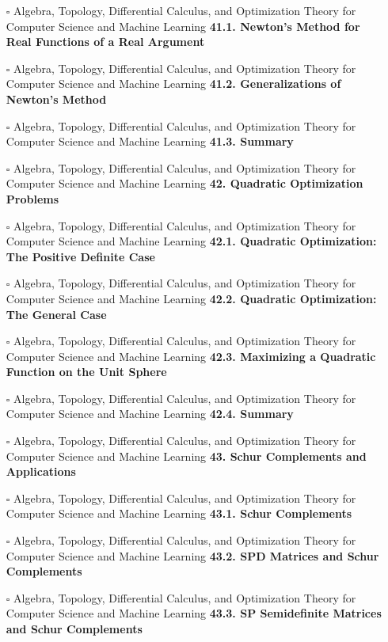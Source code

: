 \documentclass[a4, landscape, 12pt]{article}
\newcommand{\checkbox}{$\square$}%
\begin{document}
\begin{itemize}
{}
\item [\checkbox]  Algebra, Topology, Differential Calculus, and Optimization Theory for Computer Science and Machine Learning \textbf{ 41.1. Newton’s Method for Real Functions of a Real Argument
}
\item [\checkbox]  Algebra, Topology, Differential Calculus, and Optimization Theory for Computer Science and Machine Learning \textbf{ 41.2. Generalizations of Newton’s Method
}
\item [\checkbox]  Algebra, Topology, Differential Calculus, and Optimization Theory for Computer Science and Machine Learning \textbf{ 41.3. Summary
}
\item [\checkbox]  Algebra, Topology, Differential Calculus, and Optimization Theory for Computer Science and Machine Learning \textbf{ 42. Quadratic Optimization Problems
}
\item [\checkbox]  Algebra, Topology, Differential Calculus, and Optimization Theory for Computer Science and Machine Learning \textbf{ 42.1. Quadratic Optimization: The Positive Definite Case
}
\item [\checkbox]  Algebra, Topology, Differential Calculus, and Optimization Theory for Computer Science and Machine Learning \textbf{ 42.2. Quadratic Optimization: The General Case
}
\item [\checkbox]  Algebra, Topology, Differential Calculus, and Optimization Theory for Computer Science and Machine Learning \textbf{ 42.3. Maximizing a Quadratic Function on the Unit Sphere
}
\item [\checkbox]  Algebra, Topology, Differential Calculus, and Optimization Theory for Computer Science and Machine Learning \textbf{ 42.4. Summary
}
\item [\checkbox]  Algebra, Topology, Differential Calculus, and Optimization Theory for Computer Science and Machine Learning \textbf{ 43. Schur Complements and Applications
}
\item [\checkbox]  Algebra, Topology, Differential Calculus, and Optimization Theory for Computer Science and Machine Learning \textbf{ 43.1. Schur Complements
}
\item [\checkbox]  Algebra, Topology, Differential Calculus, and Optimization Theory for Computer Science and Machine Learning \textbf{ 43.2. SPD Matrices and Schur Complements
}
\item [\checkbox]  Algebra, Topology, Differential Calculus, and Optimization Theory for Computer Science and Machine Learning \textbf{ 43.3. SP Semidefinite Matrices and Schur Complements
}
\end{itemize}
\end{document}
